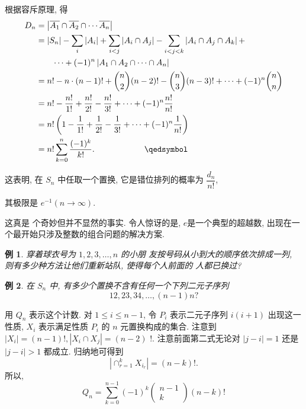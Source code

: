 \documentclass[punct]{ctexbeamer}
\newtheorem{ex}{例}
\def\sol{\noindent {\bf 解\ }}
\begin{document}
\begin{frame}
    根据容斥原理, 得
    $$
    \begin{aligned}
        D_{n} &=\left|\overline{A_{1}} \cap \overline{A_{2}} \cap \cdots \overline{A_{n}}\right| \\
        &=\left|S_{n}\right|-\sum_{i}\left|A_{i}\right|+\sum_{i<j}\left|A_{i} \cap A_{j}\right|-\sum_{i<j<k}\left|A_{i} \cap A_{j} \cap A_{k}\right|+\\
        & \quad \quad \cdots +(-1)^{n}\left|A_{1} \cap A_{2} \cap \cdots \cap A_{n}\right| \\
        &=n !-n \cdot(n-1) !+\binom{n}{2}  (n-2)!- \binom{n}{3}  (n-3)!+\cdots+(-1)^{n}\binom{n}{n}  \\
        &=n !-\frac{n !}{1 !}+\frac{n !}{2 !}-\frac{n!}{3 !}+\cdots+(-1)^{n} \frac{n !}{n !} \\
        & =  n !\left( 1-\frac{1}{1 !}+\frac{1}{2 !}-\frac{1}{3 !}+\cdots+(-1)^{n} \frac{1}{n !} \right)\\
        &=n ! \sum_{k=0}^{n} \frac{(-1)^{k}}{k !}. \qquad  \qquad\qquad \qedsymbol
    \end{aligned}
    $$



    这表明, 在 $S_n$ 中任取一个置换, 它是错位排列的概率为 $\dfrac{d_n}{n!}$,

     其极限是 $e^{-1} (n \rightarrow \infty)$.

    这真是 个奇妙但并不显然的事实. 	令人惊讶的是, $\mathit{e}$是一个典型的超越数, 出现在一个最开始只涉及整数的组合问题的解决方案.
\end{frame}



\begin{frame}

\begin{ex}
    穿着球衣号为 $1,2,3, \ldots, n$ 的小朋 友按号码从小到大的顺序依次排成一列, 则有多少种方法让他们重新站队, 使得每个人前面的 人都已换过?
\end{ex}
\pause
\begin{ex}
在 $S_n$ 中, 有多少个置换不含有任何一个下列二元子序列
$$
12,23,34, \ldots,(n-1) n ?
$$
\end{ex}
\pause

\sol 用 $Q_n$ 表示这个计数.  对 $1 \leqslant i \leqslant n-1$, 令 $P_i$ 表示二元子序列 $i(i+1)$ 出现这一性质, $X_i$ 表示满足性质 $P_i$ 的 $n$ 元置换构成的集合. 注意到 $\left|X_i\right|=(n-1) !,\left|X_i \cap X_j\right|=(n-2)$ !. 注意前面第二式无论对 $|j-i|=1$ 还是 $|j-i|>1$ 都成立. 归纳地可得到
$$
\left|\cap_{r=1}^k X_{i_r}\right|=(n-k) ! .
$$
所以,
$$
Q_n=\sum_{k=0}^{n-1}(-1)^k\left(\begin{array}{c}
    n-1 \\
    k
\end{array}\right)(n-k) !
$$
\end{frame}
\end{document}
